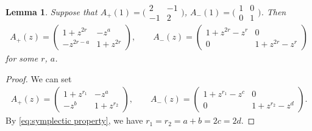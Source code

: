 \documentclass[pdftex]{sigma}
\numberwithin{equation}{section}
\newtheorem{Lemma}[Theorem]{Lemma}
\theoremstyle{definition}
\begin{document}
\begin{Lemma}\label{lemma:Apm(z) 4}
 Suppose that
$
 A_{+}(1) =
 \bigl( \begin{smallmatrix}
 2 & - 1 \\
 -1 & 2
\end{smallmatrix}\bigr)$, $
 A_{-}(1) =
 \bigl( \begin{smallmatrix}
 1 & 0 \\
 0 & 1
\end{smallmatrix}\bigr)$.
 Then
 \begin{align*}
 A_{+}(z) =
 \begin{pmatrix}
 1+z^{2r} & - z^a \\
 -z^{2r-a} & 1+z^{2r}
 \end{pmatrix},\qquad
 A_{-}(z) =
 \begin{pmatrix}
 1+z^{2r}-z^r & 0 \\
 0 & 1+z^{2r}-z^r
 \end{pmatrix}
 \end{align*}
 for some $r$, $a$.
\end{Lemma}
\begin{proof}
 We can set
 \begin{align*}
 A_{+}(z) =
 \begin{pmatrix}
 1+z^{r_1} & - z^a \\
 -z^b & 1+z^{r_2}
 \end{pmatrix},\qquad
 A_{-}(z) =
 \begin{pmatrix}
 1+z^{r_1}-z^c & 0 \\
 0 & 1+z^{r_2}-z^d
 \end{pmatrix}.
 \end{align*}
 By \eqref{eq:symplectic property},
 we have $r_1=r_2=a+b=2c=2d$.
\end{proof}
\end{document}
